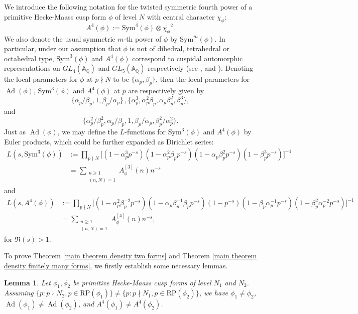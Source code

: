 \documentclass[10pt,leqno]{amsart}
\theoremstyle{plain}
\newtheorem{lemma}{Lemma}
\theoremstyle{definition}
\theoremstyle{remark}
\numberwithin{equation}{section}
\newcommand{\Ad}{\operatorname{Ad}}
\newcommand{\RP}{\text{RP}}
\newcommand{\Sym}{\text{Sym}}
\begin{document}
 We introduce the following notation for the twisted symmetric fourth power of a primitive Hecke-Maass cusp form $\phi$ of level $N$ with central character $\chi_{\phi}$:
\[
    A^4(\phi) := \Sym^4(\phi)\otimes \overline{\chi_{\phi}}^2.
\]
 We also denote the usual symmetric $m$-th power of $\phi$ by $\Sym^m(\phi)$. In particular, under our assumption that $\phi$ is not of dihedral, tetrahedral or octahedral type, $\Sym^3(\phi)$ and $A^4(\phi)$ correspond to cuspidal automorphic representations on $GL_4(\mathbb{A}_{\mathbb{Q}})$ and $GL_5(\mathbb{A}_{\mathbb{Q}})$ respectively (see \cite{Kim2003},\cite{KimShahidi2002} and \cite{KimShahidi2MR1923967}). Denoting the local parameters for $\phi$ at $p\nmid N$ to be $\{\alpha_p, \beta_p\}$, then the local parameters for $\Ad(\phi)$, $\Sym^3(\phi)$ and $A^4(\phi)$ at $p$ are respectively given by 
 \[
    \{\alpha_p/\beta_p, 1, \beta_p/\alpha_p\}\,,\{\alpha_p^3, \alpha_p^2\beta_p, \alpha_p\beta_p^2, \beta_p^3\},
 \]
 and 
 \[
    \{\alpha_p^2/\beta_p^2, \alpha_p/\beta_p, 1, \beta_p/\alpha_p, \beta_p^2/\alpha_p^2\}.
 \]
 Just as $\Ad(\phi)$, we may define the $L$-functions for $\Sym^3(\phi)$ and $A^4(\phi)$ by Euler products, which could be further expanded as Dirichlet series:
 \begin{align*}
     L(s,\Sym^3(\phi)) & := \prod_{p\nmid N}\big[(1-\alpha_p^3p^{-s})(1-\alpha_p^2\beta_pp^{-s})(1-\alpha_p\beta_p^2p^{-s})(1-\beta_p^3p^{-s})
     \big]^{-1} \\
     & = \sum_{\substack{n\geq 1 \\ (n,N)=1}}A^{[3]}_{\phi}(n)n^{-s}
 \end{align*}
 and 
  \begin{align*}
     L(s,A^4(\phi)) & := \prod_{p\nmid N}\big[(1-\alpha_p^2\beta_p^{-2}p^{-s})(1-\alpha_p\beta_p^{-1}\beta_pp^{-s})(1-p^{-s})(1-\beta_p\alpha_p^{-1}p^{-s})(1-\beta_p^2\alpha_p^{-2}p^{-s})
     \big]^{-1} \\
     & = \sum_{\substack{n\geq 1 \\ (n,N)=1}}A^{[4]}_{\phi}(n)n^{-s},
 \end{align*}
 for $\Re(s) > 1$.

To prove Theorem \ref{main theorem density two forms} and Theorem \ref{main theorem density finitely many forms}, we firstly establish some necessary lemmas. 
\begin{lemma}\label{small lemma}
    Let $\phi_1,\phi_2$ be primitive Hecke-Maass cusp forms of level $N_1$ and $N_2$. Assuming $\{p:p \nmid N_2,p \in \RP(\phi_1)\} \neq \{p:p \nmid N_1, p \in \RP(\phi_2)\}$, we have $\phi_1 \neq \phi_2$, $\Ad(\phi_1) \neq \Ad(\phi_2)$, and $A^4(\phi_1) \neq A^4(\phi_2)$. 
\end{lemma}
\end{document}
